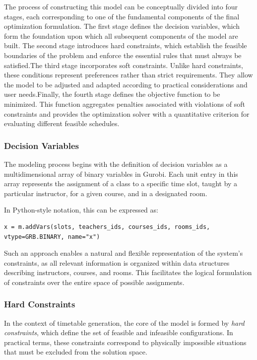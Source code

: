 \documentclass[11pt,a4paper]{article}
\begin{document}
The process of constructing this model can be conceptually divided into four stages, each corresponding to one of the fundamental components of the final optimization formulation. The first stage defines the decision variables, which form the foundation upon which all subsequent components of the model are built. The second stage introduces hard constraints, which establish the feasible boundaries of the problem and enforce the essential rules that must always be satisfied.The third stage incorporates soft constraints. Unlike hard constraints, these conditions represent preferences rather than strict requirements. They allow the model to be adjusted and adapted according to practical considerations and user needs.Finally, the fourth stage defines the objective function to be minimized. This function aggregates penalties associated with violations of soft constraints and provides the optimization solver with a quantitative criterion for evaluating different feasible schedules.

\subsubsection{Decision Variables}
The modeling process begins with the definition of decision variables as a multidimensional array of binary variables in Gurobi. Each unit entry in this array represents the assignment of a class to a specific time slot, taught by a particular instructor, for a given course, and in a designated room.

In Python-style notation, this can be expressed as:
\begin{verbatim}
x = m.addVars(slots, teachers_ids, courses_ids, rooms_ids, vtype=GRB.BINARY, name="x")
\end{verbatim}

Such an approach enables a natural and flexible representation of the system's constraints, as all relevant information is organized within data structures describing instructors, courses, and rooms. This facilitates the logical formulation of constraints over the entire space of possible assignments.
\subsubsection{Hard Constraints}
In the context of timetable generation, the core of the model is formed by \emph{hard constraints}, which define the set of feasible and infeasible configurations. In practical terms, these constraints correspond to physically impossible situations that must be excluded from the solution space.
\end{document}
